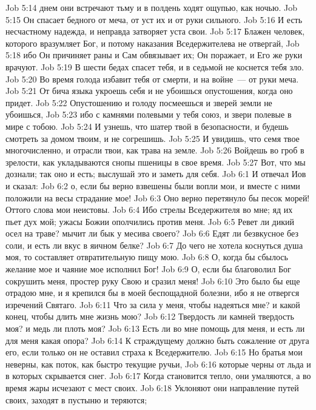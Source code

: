 \vs Job 5:14 днем они встречают тьму и в полдень ходят ощупью, как ночью.
\vs Job 5:15 Он спасает бедного от меча, от уст их и от руки сильного.
\vs Job 5:16 И есть несчастному надежда, и неправда затворяет уста свои.
\vs Job 5:17 Блажен человек, которого вразумляет Бог, и потому наказания Вседержителева не отвергай,
\vs Job 5:18 ибо Он причиняет раны и Сам обвязывает их; Он поражает, и Его же руки врачуют.
\vs Job 5:19 В шести бедах спасет тебя, и в седьмой не коснется тебя зло.
\vs Job 5:20 Во время голода избавит тебя от смерти, и на войне~--- от руки меча.
\vs Job 5:21 От бича языка укроешь себя и не убоишься опустошения, когда оно придет.
\vs Job 5:22 Опустошению и голоду посмеешься и зверей земли не убоишься,
\vs Job 5:23 ибо с камнями полевыми у тебя союз, и звери полевые в мире с тобою.
\vs Job 5:24 И узнешь, что шатер твой в безопасности, и будешь смотреть за домом твоим, и не согрешишь.
\vs Job 5:25 И увидишь, что семя твое многочисленно, и отрасли твои, как трава на земле.
\vs Job 5:26 Войдешь во гроб в зрелости, как укладываются снопы пшеницы в свое время.
\vs Job 5:27 Вот, что мы дознали; так оно и есть; выслушай это и заметь для себя.
\vs Job 6:1 И отвечал Иов и сказал:
\vs Job 6:2 о, если бы верно взвешены были вопли мои, и вместе с ними положили на весы страдание мое!
\vs Job 6:3 Оно верно перетянуло бы песок морей! Оттого слова мои неистовы.
\vs Job 6:4 Ибо стрелы Вседержителя во мне; яд их пьет дух мой; ужасы Божии ополчились против меня.
\vs Job 6:5 Ревет ли дикий осел на траве? мычит ли бык у месива своего?
\vs Job 6:6 Едят ли безвкусное без соли, и есть ли вкус в яичном белке?
\vs Job 6:7 До чего не хотела коснуться душа моя, то составляет отвратительную пищу мою.
\vs Job 6:8 О, когда бы сбылось желание мое и чаяние мое исполнил Бог!
\vs Job 6:9 О, если бы благоволил Бог сокрушить меня, простер руку Свою и сразил меня!
\vs Job 6:10 Это было бы еще отрадою мне, и я крепился бы в моей беспощадной болезни, ибо я не отвергся изречений Святаго.
\vs Job 6:11 Что за сила у меня, чтобы надеяться мне? и какой конец, чтобы длить мне жизнь мою?
\vs Job 6:12 Твердость ли камней твердость моя? и медь ли плоть моя?
\vs Job 6:13 Есть ли во мне помощь для меня, и есть ли для меня какая опора?
\vs Job 6:14 К страждущему должно быть сожаление от друга его, если только он не оставил страха к Вседержителю.
\vs Job 6:15 Но братья мои неверны, как поток, как быстро текущие ручьи,
\vs Job 6:16 которые черны от льда и в которых скрывается снег.
\vs Job 6:17 Когда становится тепло, они умаляются, а во время жары исчезают с мест своих.
\vs Job 6:18 Уклоняют они направление путей своих, заходят в пустыню и теряются;
